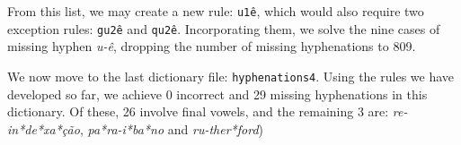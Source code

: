 From this list, we may create a new rule: \texttt{u1ê}, which would also require two exception rules: \texttt{gu2ê} and \texttt{qu2ê}.
%
Incorporating them, we solve the nine cases of missing hyphen \emph{u-ê}, dropping the number of missing hyphenations to 809.


We now move to the last dictionary file: \texttt{hyphenations4}. Using the rules we have developed so far,
we achieve 0 incorrect and 29 missing hyphenations in this dictionary. 
Of these, 26 involve final vowels, and the remaining 3 are:
\emph{re-in*de*xa*ção}, \emph{pa*ra-i*ba*no} and \emph{ru-ther*ford})

